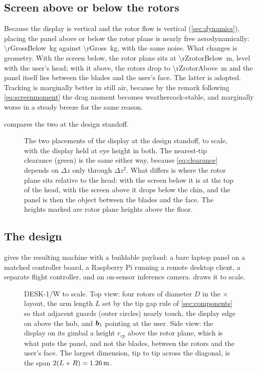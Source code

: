 \subsection{Screen above or below the rotors}

Because the display is vertical and the rotor flow is vertical
(\cref{sec:dynamics}), placing the panel above or below the rotor plane is
nearly free aerodynamically: \SI{\rGrossBelow}{\kilo\gram} against
\SI{\rGross}{\kilo\gram}, with the same noise. What changes is geometry. With
the screen below, the rotor plane sits at \SI{\rZrotorBelow}{\metre}, level
with the user's head; with it above, the rotors drop to
\SI{\rZrotorAbove}{\metre} and the panel itself lies between the blades and
the user's face. The latter is adopted. Tracking is marginally better in still
air, because by the remark following \cref{eq:screenmoment} the drag moment
becomes weathercock-stable, and marginally worse in a steady breeze for the
same reason.

 compares the two at the design standoff.

\begin{figure}[tbp]
\centering

\caption{The two placements of the display at the design standoff, to scale,
with the display held at eye height in both. The nearest-tip clearance
(green) is the same either way, because \cref{eq:clearance} depends on
$\Delta z$ only through $\Delta z^2$. What differs is where the rotor plane
sits relative to the head: with the screen below it is at the top of the head,
with the screen above it drops below the chin, and the panel is then the
object between the blades and the face. The heights marked are rotor plane
heights above the floor.}
\label{fig:placement}
\end{figure}

\subsection{The design}

 gives the resulting machine with a buildable payload: a bare
laptop panel on a matched controller board, a Raspberry Pi running a remote
desktop client, a separate flight controller, and an on-sensor inference
camera.  draws it to scale.

\begin{figure}[tbp]
\centering

\caption{DESK-1/W to scale. Top view: four rotors of diameter $D$ in the
$\times$ layout, the arm length $L$ set by the tip gap rule of
\cref{sec:components} so that adjacent guards (outer circles) nearly touch,
the display edge on above the hub, and $\bm{b}_1$ pointing at the user. Side
view: the display on its gimbal a height $r_{cp}$ above the rotor plane,
which is what puts the panel, and not the blades, between the rotors and the
user's face. The largest dimension, tip to tip across the diagonal, is the
span $2(L+R)=\SI{1.26}{\metre}$.}
\label{fig:design}
\end{figure}

